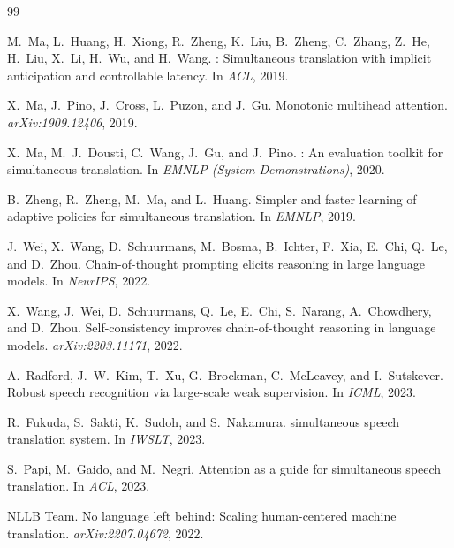 \documentclass{article}
\begin{document}
\small

\begin{thebibliography}{99}

M.~Ma, L.~Huang, H.~Xiong, R.~Zheng, K.~Liu, B.~Zheng, C.~Zhang, Z.~He, H.~Liu,
  X.~Li, H.~Wu, and H.~Wang.
: Simultaneous translation with implicit anticipation and
  controllable latency.
\newblock In \emph{ACL}, 2019.

X.~Ma, J.~Pino, J.~Cross, L.~Puzon, and J.~Gu.
\newblock Monotonic multihead attention.
\newblock \emph{arXiv:1909.12406}, 2019.

X.~Ma, M.~J.~Dousti, C.~Wang, J.~Gu, and J.~Pino.
: An evaluation toolkit for simultaneous translation.
\newblock In \emph{EMNLP (System Demonstrations)}, 2020.

B.~Zheng, R.~Zheng, M.~Ma, and L.~Huang.
\newblock Simpler and faster learning of adaptive policies for simultaneous
  translation.
\newblock In \emph{EMNLP}, 2019.

J.~Wei, X.~Wang, D.~Schuurmans, M.~Bosma, B.~Ichter, F.~Xia, E.~Chi, Q.~Le, and
  D.~Zhou.
\newblock Chain-of-thought prompting elicits reasoning in large language
  models.
\newblock In \emph{NeurIPS}, 2022.

X.~Wang, J.~Wei, D.~Schuurmans, Q.~Le, E.~Chi, S.~Narang, A.~Chowdhery, and
  D.~Zhou.
\newblock Self-consistency improves chain-of-thought reasoning in language
  models.
\newblock \emph{arXiv:2203.11171}, 2022.

A.~Radford, J.~W.~Kim, T.~Xu, G.~Brockman, C.~McLeavey, and I.~Sutskever.
\newblock Robust speech recognition via large-scale weak supervision.
\newblock In \emph{ICML}, 2023.

R.~Fukuda, S.~Sakti, K.~Sudoh, and S.~Nakamura.
 simultaneous speech translation system.
\newblock In \emph{IWSLT}, 2023.

S.~Papi, M.~Gaido, and M.~Negri.
\newblock Attention as a guide for simultaneous speech translation.
\newblock In \emph{ACL}, 2023.

NLLB Team.
\newblock No language left behind: Scaling human-centered machine translation.
\newblock \emph{arXiv:2207.04672}, 2022.


\end{thebibliography}
\end{document}
